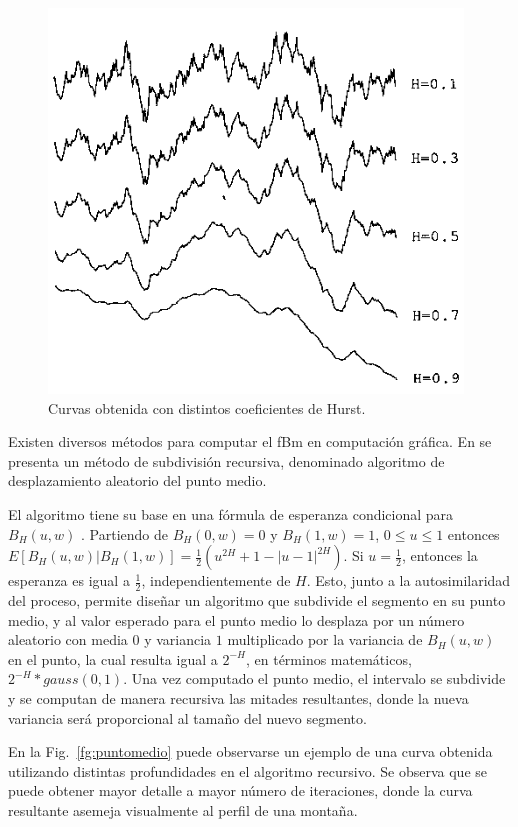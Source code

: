 \begin{figure}
\center
\includegraphics[width=11cm]{figures/hurst}
\caption{Curvas obtenida con distintos coeficientes de Hurst.}
\label{fg:hurst}
\end{figure}

Existen diversos métodos para computar el fBm en computación gráfica.
En \cite{Fournier1982} se presenta un método de subdivisión recursiva, denominado algoritmo de desplazamiento aleatorio del punto medio.

El algoritmo tiene su base en una fórmula de esperanza condicional para $B_{H}(u,w)$ \cite{Mandelbrot1968}.
Partiendo de $B_{H}(0,w) = 0$ y $B_{H}(1,w) = 1$, $0 \le u \le 1$ entonces $E[B_{H}(u,w)|B_{H}(1,w)] = \frac{1}{2} (u^{2H} + 1 - |u-1|^{2H})$.
Si $u=\frac{1}{2}$, entonces la esperanza es igual a $\frac{1}{2}$, independientemente de $H$.
Esto, junto a la autosimilaridad del proceso, permite diseñar un algoritmo que subdivide el segmento en su punto medio, y al valor esperado para el punto medio lo desplaza por un número aleatorio con media $0$ y variancia $1$ multiplicado por la variancia de $B_{H}(u,w)$ en el punto, la cual resulta igual a $2^{-H}$, en términos matemáticos, $2^{-H} * gauss(0,1) $.
Una vez computado el punto medio, el intervalo se subdivide y se computan de manera recursiva las mitades resultantes, donde la nueva variancia será proporcional al tamaño del nuevo segmento.

En la Fig.~\ref{fg:puntomedio} puede observarse un ejemplo de una curva obtenida utilizando distintas profundidades en el algoritmo recursivo.
Se observa que se puede obtener mayor detalle a mayor número de iteraciones, donde la curva resultante asemeja visualmente al perfil de una montaña.

